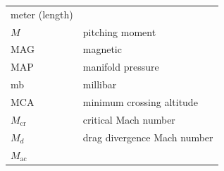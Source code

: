 \documentclass[
]{book}
\begin{document}
\begin{longtable}[]{@{}ll@{}}
\begin{minipage}[t]{0.47\columnwidth}
meter (length)\strut
\end{minipage}\tabularnewline
\begin{minipage}[t]{0.47\columnwidth}\raggedright
\(M\)\strut
\end{minipage} & \begin{minipage}[t]{0.47\columnwidth}\raggedright
pitching moment\strut
\end{minipage}\tabularnewline
\begin{minipage}[t]{0.47\columnwidth}\raggedright
MAG\strut
\end{minipage} & \begin{minipage}[t]{0.47\columnwidth}\raggedright
magnetic\strut
\end{minipage}\tabularnewline
\begin{minipage}[t]{0.47\columnwidth}\raggedright
MAP\strut
\end{minipage} & \begin{minipage}[t]{0.47\columnwidth}\raggedright
manifold pressure\strut
\end{minipage}\tabularnewline
\begin{minipage}[t]{0.47\columnwidth}\raggedright
mb\strut
\end{minipage} & \begin{minipage}[t]{0.47\columnwidth}\raggedright
millibar\strut
\end{minipage}\tabularnewline
\begin{minipage}[t]{0.47\columnwidth}\raggedright
MCA\strut
\end{minipage} & \begin{minipage}[t]{0.47\columnwidth}\raggedright
minimum crossing altitude\strut
\end{minipage}\tabularnewline
\begin{minipage}[t]{0.47\columnwidth}\raggedright
\(M_{\mathrm{cr}}\)\strut
\end{minipage} & \begin{minipage}[t]{0.47\columnwidth}\raggedright
critical Mach number\strut
\end{minipage}\tabularnewline
\begin{minipage}[t]{0.47\columnwidth}\raggedright
\(M_d\)\strut
\end{minipage} & \begin{minipage}[t]{0.47\columnwidth}\raggedright
drag divergence Mach number\strut
\end{minipage}\tabularnewline
\begin{minipage}[t]{0.47\columnwidth}\raggedright
\(M_{\mathrm{ac}}\)\strut

\end{minipage}
\end{longtable}
\end{document}
